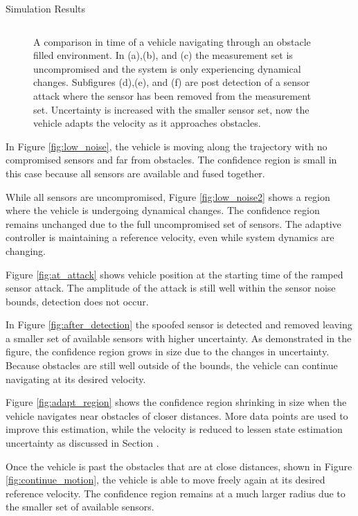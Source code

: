 \begin{section}{Simulation Results}
\begin{figure}[b!th]
\begin{tabular}{ccc}
\end{tabular}
\caption{A comparison in time of a vehicle navigating through an obstacle filled environment. In (a),(b), and (c) the measurement set is uncompromised and the system is only experiencing dynamical changes. Subfigures (d),(e), and (f) are post detection of a sensor attack where the sensor has been removed from the measurement set. Uncertainty is increased with the smaller sensor set, now the vehicle adapts the velocity as it approaches obstacles.}

\end{figure}

In Figure \ref{fig:low_noise}, the vehicle is moving along the trajectory with no compromised sensors and far from obstacles. The confidence region is small in this case because all sensors are available and fused together. 

While all sensors are uncompromised, Figure \ref{fig:low_noise2} shows a region where the vehicle is undergoing dynamical changes. The confidence region remains unchanged due to the full uncompromised set of sensors. The adaptive controller is maintaining a reference velocity, even while system dynamics are changing.

Figure \ref{fig:at_attack} shows vehicle position at the starting time of the ramped sensor attack. The amplitude of the attack is still well within the sensor noise bounds, detection does not occur.


In Figure \ref{fig:after_detection} the spoofed sensor is detected and removed leaving a smaller set of available sensors with higher uncertainty. As demonstrated in the figure, the confidence region grows in size due to the changes in uncertainty. Because obstacles are still well outside of the bounds, the vehicle can continue navigating at its desired velocity.

Figure \ref{fig:adapt_region} shows the confidence region shrinking in size when the vehicle navigates near obstacles of closer distances. More data points are used to improve this estimation, while the velocity is reduced to lessen state estimation uncertainty as discussed in Section .

Once the vehicle is past the obstacles that are at close distances, shown in Figure \ref{fig:continue_motion}, the vehicle is able to move freely again at its desired reference velocity. The confidence region remains at a much larger radius due to the smaller set of available sensors.


\end{section}
